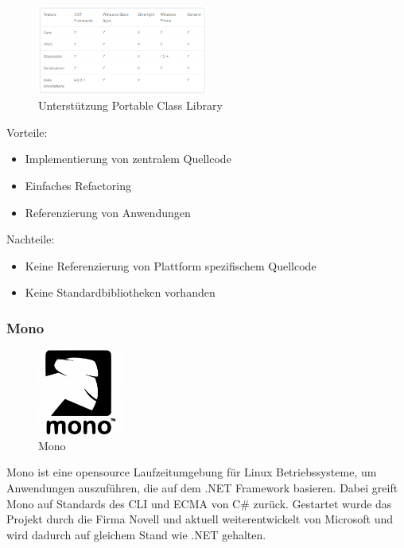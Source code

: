 \begin{figure}
	\begin{center}
		\includegraphics[width=0.5\textwidth]{images/technische_grundlagen/pclSupport.png}
	\end{center}
	\caption{Unterstützung Portable Class Library}
	\label{fig:pcl_support}
\end{figure}

\noindent
Vorteile:
\begin{itemize}
	\item Implementierung von zentralem Quellcode
	\item Einfaches Refactoring
	\item Referenzierung von Anwendungen
\end{itemize}
\noindent
Nachteile:
\begin{itemize}
	\item Keine Referenzierung von Plattform spezifischem Quellcode
	\item Keine Standardbibliotheken vorhanden
\end{itemize}
\color{process}
\newpage
\subsubsection{Mono}\label{mono}

\begin{figure}
	\begin{center}
		\includegraphics[width=0.25\textwidth]{images/technische_grundlagen/mono.png}
	\end{center}
	\caption{Mono}
	\label{fig:mono}
\end{figure}

Mono ist eine opensource Laufzeitumgebung für Linux Betriebssysteme, um Anwendungen auszuführen, die auf dem .NET Framework basieren. Dabei greift Mono auf Standards des CLI und ECMA von C\# zurück. Gestartet wurde das Projekt durch die Firma Novell und aktuell weiterentwickelt von Microsoft und wird dadurch auf gleichem Stand wie .NET gehalten.

